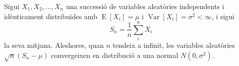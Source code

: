 \documentclass{article}
\begin{document}
Sigui $X_1, X_2, \ldots, X_n$ una successió de variables aleatòries independents 
i idènticament distribuïdes amb
$\operatorname{E}[X_i] = \mu$ i
$\operatorname{Var}[X_i] = \sigma^2 < \infty$, i sigui
\begin{equation*}
S_n = \frac{1}{n}\sum_{i}^{n} X_i
\end{equation*}
la seva mitjana. Aleshores, quan $n$ tendeix a infinit, les 
variables aleatòries $\sqrt{n}(S_n - \mu)$ convergeixen en
distribució a una normal $N(0, \sigma^2)$.

\end{document}
